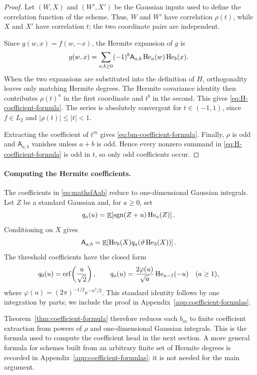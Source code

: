 \begin{proof}
Let \((W,X)\) and \((W',X')\) be the Gaussian inputs used to define the
correlation function of the scheme. Thus, \(W\) and \(W'\) have correlation
\(\rho(t)\), while \(X\) and \(X'\) have correlation \(t\); the two
coordinate pairs are independent.

Since \(g(w,x)=f(w,-x)\), the Hermite expansion of \(g\) is
\[
  g(w,x)
  =
  \sum_{a,b\geq 0}
  (-1)^b\mathsf A_{a,b}\operatorname{He}_a(w)\operatorname{He}_b(x).
\]
When the two expansions are substituted into the definition of \(H\),
orthogonality leaves only matching Hermite degrees. The Hermite covariance
identity then contributes \(\rho(t)^a\) in the first coordinate and \(t^b\)
in the second. This gives \eqref{eq:H-coefficient-formula}. The series is
absolutely convergent for \(t\in(-1,1)\), since \(f\in L_2\) and
\(|\rho(t)|\leq |t|<1\).

Extracting the coefficient of \(t^m\) gives
\eqref{eq:bm-coefficient-formula}. Finally, \(\rho\) is odd and
\(\mathsf A_{a,b}\) vanishes unless \(a+b\) is odd. Hence every nonzero
summand in \eqref{eq:H-coefficient-formula} is odd in \(t\), so only odd
coefficients occur.
\end{proof}

\paragraph{Computing the Hermite coefficients.}
The coefficients in \eqref{eq:mathsfAab} reduce to
one-dimensional Gaussian integrals. Let \(Z\) be a standard Gaussian and,
for \(a\geq 0\), set
\begin{equation}
  q_a(u)
  =
  \mathop{\mathbb{E}}\!\left[\operatorname{sgn}(Z+u)\operatorname{He}_a(Z)\right].
  \label{eq:threshold-hermite-coefficients}
\end{equation}
Conditioning on \(X\) gives
\begin{equation}
  \mathsf A_{a,b}
  =
  \mathop{\mathbb{E}}\!\left[
    \operatorname{He}_b(X)q_a\!\left(\vartheta\operatorname{He}_3(X)\right)
  \right].
  \label{eq:f-coefficients-one-dimensional}
\end{equation}
The threshold coefficients have the closed form
\begin{equation}
  q_0(u)
  =
  \operatorname{erf}\!\left(\frac{u}{\sqrt{2}}\right),
  \qquad
  q_a(u)
  =
  \frac{2\varphi(u)}{\sqrt{a}}\operatorname{He}_{a-1}(-u)
  \quad (a\geq 1),
  \label{eq:threshold-hermite-closed-form}
\end{equation}
where \(\varphi(u)=(2\pi)^{-1/2}e^{-u^2/2}\). This standard identity follows
by one integration by parts; we include the proof in
Appendix~\ref{app:coefficient-formulas}.

Theorem~\ref{thm:coefficient-formula} therefore reduces each \(b_m\) to
finite coefficient extraction from powers of \(\rho\) and one-dimensional
Gaussian integrals. This is the formula used to compute the coefficient head
in the next section. A more general formula for schemes built from an
arbitrary finite set of Hermite degrees is recorded in
Appendix~\ref{app:coefficient-formulas}; it is not needed for the main
argument.

